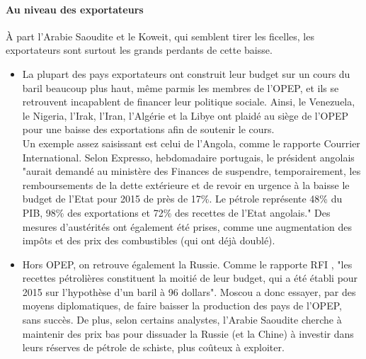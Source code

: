 \paragraph{Au niveau des exportateurs}
À part l’Arabie Saoudite et le Koweit, qui semblent tirer les ficelles, les exportateurs sont surtout les grands perdants de cette baisse.
\begin{itemize}
	\item La plupart des pays exportateurs ont construit leur budget sur un cours du baril beaucoup plus haut, même parmis les membres de l’OPEP, et ils se retrouvent incapablent de financer leur politique sociale. Ainsi, le Venezuela, le Nigeria, l’Irak, l’Iran, l’Algérie et la Libye ont plaidé au siège de l’OPEP pour une baisse des exportations afin de soutenir le cours.\\
Un exemple assez saisissant est celui de l’Angola, comme le rapporte Courrier International. Selon Expresso, hebdomadaire portugais, le président angolais "aurait demandé au ministère des Finances de suspendre, temporairement, les remboursements de la dette extérieure et de revoir en urgence à la baisse le budget de l’Etat pour 2015 de près de 17\%. Le pétrole représente 48\% du PIB, 98\% des exportations et 72\% des recettes de l’Etat angolais." Des mesures d’austérités ont également été prises, comme une augmentation des impôts et des prix des combustibles (qui ont déjà doublé). \cite{CourInterAngola}
	\item Hors OPEP, on retrouve également la Russie. Comme le rapporte RFI \cite{rfiOpepDiv}, "les recettes pétrolières constituent la moitié de leur budget, qui a été établi pour 2015 sur l’hypothèse d’un baril à 96 dollars". Moscou a donc essayer, par des moyens diplomatiques, de faire baisser la production des pays de l’OPEP, sans succès. De plus, selon certains analystes, l’Arabie Saoudite cherche à maintenir des prix bas pour dissuader la Russie (et la Chine) à investir dans leurs réserves de pétrole de schiste, plus coûteux à exploiter. 
\end{itemize}

